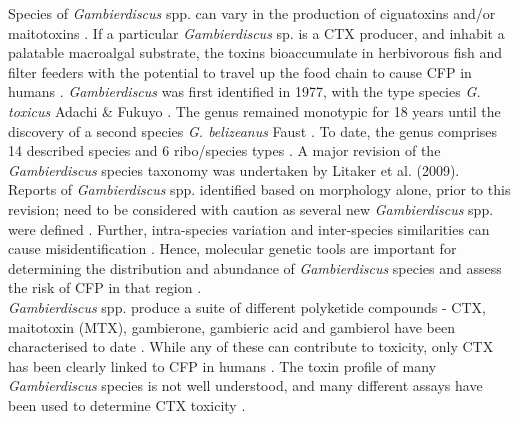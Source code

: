 \documentclass[12pt]{article}
\begin{document}
Species of \textit{Gambierdiscus} spp. can vary in the production of ciguatoxins and/or maitotoxins \citep{chinain2010ciguatera,kohli2014high}. 
If a particular \emph{Gambierdiscus} sp. is a CTX producer, and inhabit a palatable macroalgal substrate, the toxins bioaccumulate in herbivorous fish and filter feeders with the potential to travel up the food chain to cause CFP in humans  \citep{chinain1997intraspecific,holmes1998gambierdiscus}. 
\FloatBarrier
\emph{Gambierdiscus} was first identified in 1977, with the type species \emph{G. toxicus} Adachi \& Fukuyo \citep{adachi1979thecal}. 
The genus remained monotypic for 18 years until the discovery of a second species \emph{G. belizeanus} Faust \citep{faust1995observation}. 
To date, the genus comprises 14 described species and 6 ribo/species types
 \citep{smith2016new,fraga2016gambierdiscus,litaker2010global,adachi1979thecal,faust1995observation,chinain1999morphology,litaker2009taxonomy,dai2017taxonomic,nishimura2014morphology,rhodes2017new,kretzschmar2017characterization,fraga2011gambierdiscus,xu2014distribution,fraga2014genus} .
A major revision of the \emph{Gambierdiscus} species taxonomy was undertaken by Litaker et al. (2009). 
Reports of \emph{Gambierdiscus} spp. identified based on morphology alone, prior to this revision; need to be considered with caution as several new \emph{Gambierdiscus} spp. were defined \cite{holmes1990toxicity,holmes1991strain,holmes1994purification}. 
Further, intra-species variation and inter-species similarities can cause misidentification \citep{bravo2014cellular,kretzschmar2017characterization,kohli2014high}. 
Hence, molecular genetic tools are important for determining the distribution and abundance of  \textit{Gambierdiscus} species and assess the risk of CFP in that region \citep{kohli2014high,kretzschmar2017characterization}. \\
\emph{Gambierdiscus} spp. produce a suite of different polyketide compounds - CTX, maitotoxin (MTX), gambierone, gambieric acid and gambierol have been characterised to date \citep{satake1993gambierol,nagai1992gambieric,rodriguez2015gambierone,murata1993structure,murata1989structures}. 
While any of these can contribute to toxicity, only CTX has been clearly linked to CFP in humans \citep{chinain1997intraspecific,holmes1998gambierdiscus}. 
The toxin profile of many \textit{Gambierdiscus} species is not well understood, and many different assays have been used to determine CTX toxicity \citep{globalcig}. 
\end{document}

